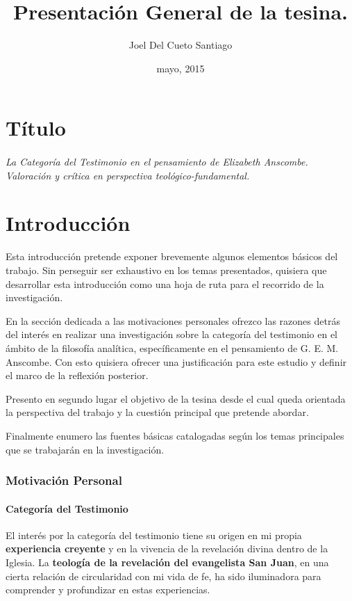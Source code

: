 \documentclass[12pt]{article}
\title{Presentación General de la tesina.}
\author{Joel Del Cueto Santiago}
\date{mayo, 2015}
\begin{document}

\maketitle

\part*{Título}
\paragraph{\noindent La Categoría del Testimonio en el pensamiento de Elizabeth Anscombe.\\
\emph{Valoración y crítica en perspectiva teológico-fundamental.}}

\part*{Introducción}

Esta introducción pretende exponer brevemente algunos elementos básicos del trabajo. Sin perseguir ser exhaustivo en los temas presentados, quisiera que desarrollar esta introducción como una hoja de ruta para el recorrido de la investigación. 

En la sección dedicada a las motivaciones personales ofrezco las razones detrás del interés en realizar una investigación sobre la categoría del testimonio en el ámbito de la filosofía analítica, específicamente en el pensamiento de G. E. M. Anscombe. Con esto quisiera ofrecer una justificación para este estudio y definir el marco de la reflexión posterior.

Presento en segundo lugar el objetivo de la tesina desde el cual queda orientada la perspectiva del trabajo y la cuestión principal que pretende abordar.

Finalmente enumero las fuentes básicas catalogadas según los temas principales que se trabajarán en la investigación.

\section{Motivación Personal}

\subsection{Categoría del Testimonio}

El interés por la categoría del testimonio tiene su origen en mi propia \textbf{experiencia creyente} y en la vivencia de la revelación divina dentro de la Iglesia. La \textbf{teología de la revelación del evangelista San Juan}, en una cierta relación de circularidad con mi vida de fe, ha sido iluminadora para comprender y profundizar en estas experiencias.
\end{document}

